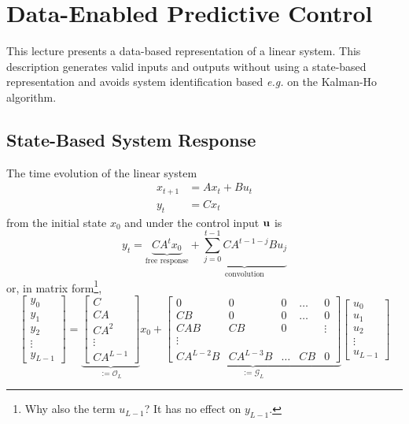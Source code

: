 \chapter{Data-Enabled Predictive Control}
\label{sec:deepc}

This lecture presents a data-based representation of a linear system. This description generates valid inputs and outputs without using a state-based representation and avoids system identification based \textit{e.g.} on the Kalman-Ho algorithm.

\section{State-Based System Response}
\label{sec:deepc-state-based-response}

The time evolution of the linear system
\begin{equation*}
  \begin{aligned}
    x_{t+1} &= Ax_t + Bu_t \\
    y_t &= Cx_t
  \end{aligned}
\end{equation*}
from the initial state $x_0$ and under the control input $\boldsymbol{\mathrm{u}}$ is
\begin{equation}
  \label{eq:time-evolution-free-response-convolution}
  y_t = \underbrace{CA^tx_0}_{\text{free response}} + \underbrace{\sum_{j=0}^{t-1}CA^{t-1-j}Bu_j}_{\text{convolution}}
\end{equation}
or, in matrix form\footnote{Why also the term $u_{L-1}$? It has no effect on $y_{L-1}$.},
\begin{equation}
  \label{eq:time-evolution-free-response-convolution-matrix}
  \begin{bmatrix}
    y_0 \\ y_1 \\ y_2 \\ \vdots \\ y_{L-1}
  \end{bmatrix} = \underbrace{
    \begin{bmatrix}
      C \\ CA \\ CA^2 \\ \vdots \\ CA^{L-1}
    \end{bmatrix}
  }_{:=\mathcal{O}_L} x_0 + \underbrace{
  \begin{bmatrix}
    0 & 0 & 0 & \ldots & 0 \\
    CB & 0 & 0 & \ldots & 0 \\
    CAB & CB & 0 & & \vdots \\
    \vdots \\
    CA^{L-2}B & CA^{L-3}B & \ldots & CB & 0
  \end{bmatrix}}_{:=\mathcal{G}_L}
\begin{bmatrix}
  u_0 \\ u_1 \\ u_2 \\ \vdots \\ u_{L-1}
  \end{bmatrix}
\end{equation}
